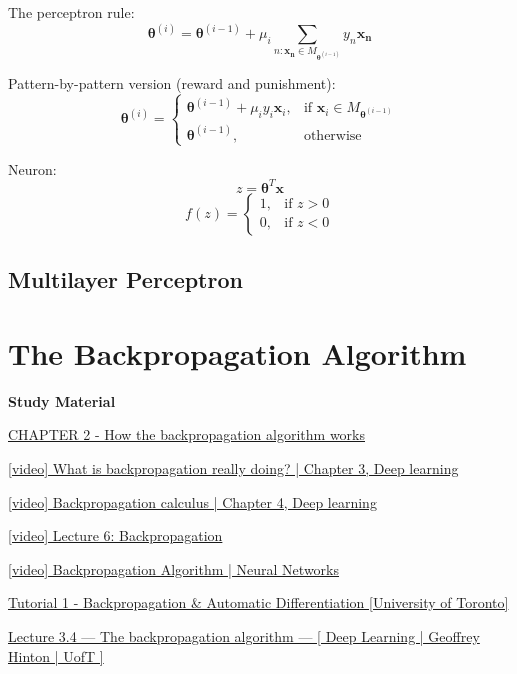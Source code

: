 \documentclass{report}
\begin{document}
The perceptron rule:
\[\symbf{\theta}^{(i)} = \symbf{\theta}^{(i-1)} + \mu_i \sum_{n: \symbf{x_n} \in M_{\symbf{\theta}^{(i-1)}}} y_n \symbf{x_n}\]

Pattern-by-pattern version (reward and punishment):
\[\symbf{\theta}^{(i)} = \begin{cases}
	\symbf{\theta}^{(i-1)} + \mu_i y_i \symbf{x}_i, &\text{if } \symbf{x}_i \in M_{\symbf{\theta}^{(i-1)}} \\
	\symbf{\theta}^{(i-1)}, &\text{otherwise}
\end{cases}\]

Neuron:
\[z = \symbf{\theta}^T \symbf{x}\]
\[f(z) = \begin{cases}
	1, & \text{if } z > 0 \\
	0, & \text{if } z < 0
\end{cases}\]

\subsection*{Multilayer Perceptron}

\section*{The Backpropagation Algorithm}

\begin{mdframed}
	\textbf{Study Material}

	\href{http://neuralnetworksanddeeplearning.com/chap2.html}{CHAPTER 2 - How the backpropagation algorithm works}

	\href{https://www.youtube.com/watch?v=Ilg3gGewQ5U&list=PLZHQObOWTQDNU6R1\_67000Dx\_ZCJB-3pi&index=3}{[video] What is backpropagation really doing? | Chapter 3, Deep learning}

	\href{https://www.youtube.com/watch?v=tIeHLnjs5U8&list=PLZHQObOWTQDNU6R1\_67000Dx\_ZCJB-3pi&index=4}{[video] Backpropagation calculus | Chapter 4, Deep learning}

	\href{https://www.youtube.com/watch?v=dB-u77Y5a6A}{[video] Lecture 6: Backpropagation}

	\href{https://www.youtube.com/watch?v=sIX\_9n-1UbM}{[video] Backpropagation Algorithm | Neural Networks}

	\href{https://www.cs.toronto.edu/~rgrosse/courses/csc2541\_2022/tutorials/tut01.pdf}{Tutorial 1 - Backpropagation \& Automatic Differentiation [University of Toronto]}

	\href{https://www.youtube.com/watch?v=VCT1N0EsGj0&list=PLLssT5z\_DsK\_gyrQ\_biidwvPYCRNGI3iv&index=14}{Lecture 3.4 — The backpropagation algorithm — [ Deep Learning | Geoffrey Hinton | UofT ]}
\end{mdframed}
\end{document}
